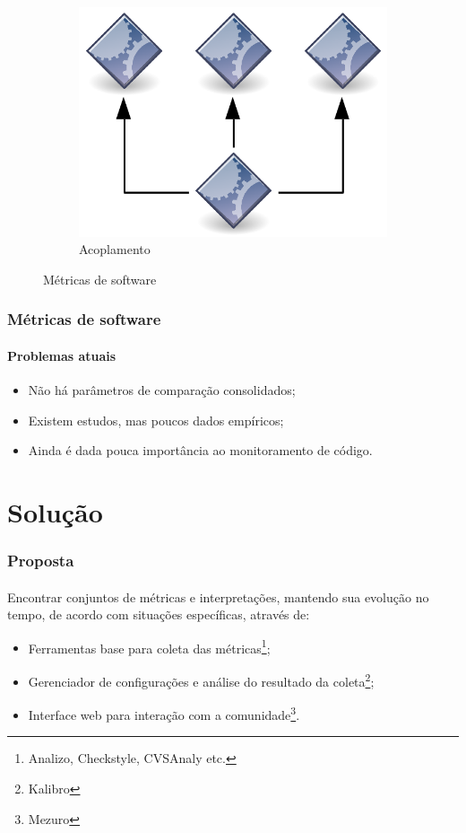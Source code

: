 \documentclass{beamer}
\begin{document}
\begin{frame}
\begin{figure}
\begin{subfigure}[b]{0.3\textwidth}
      \includegraphics[width=\textwidth]{images/coupling.png}
                \caption*{Acoplamento}
                
        \end{subfigure}
        \caption{Métricas de software}\label{fig:animals}
\end{figure}

\end{frame}

\begin{frame}
  \frametitle{Métricas de software}
  \framesubtitle{Problemas atuais}
  
  \begin{itemize}
    \item Não há parâmetros de comparação consolidados;
    \item Existem estudos, mas poucos dados empíricos;
    \item Ainda é dada pouca importância ao monitoramento de código.
  \end{itemize}
\end{frame}

\section{Solução}
  
\begin{frame}
  \frametitle{Proposta}
  \framesubtitle{}
  
  Encontrar conjuntos de métricas e interpretações, mantendo sua evolução no tempo, de acordo com situações específicas, através de:
  \begin{itemize}
    \item Ferramentas base para coleta das métricas\footnote{Analizo, Checkstyle, CVSAnaly etc.};
    \item Gerenciador de configurações e análise do resultado da coleta\footnote{Kalibro};
    \item Interface web para interação com a comunidade\footnote{Mezuro}.
  \end{itemize}
  

\end{frame}
\end{document}
